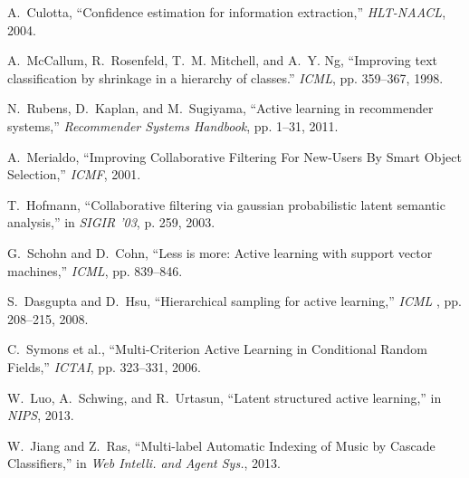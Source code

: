 \documentclass[10pt,conference,compsocconf]{IEEEtran}
\begin{document}
\begin{small}
\begin{thebibliography}{10}
A.~Culotta, ``{Confidence estimation for information extraction},''
  \emph{HLT-NAACL}, 2004. %

A.~McCallum, R.~Rosenfeld, T.~M. Mitchell, and A.~Y. Ng, ``Improving text
  classification by shrinkage in a hierarchy of classes.'' \emph{ICML},
  pp. 359--367, 1998.

N.~Rubens, D.~Kaplan, and M.~Sugiyama, ``{Active learning in recommender
  systems},'' \emph{Recommender Systems Handbook}, pp. 1--31, 2011. %

A.~Merialdo, ``{Improving Collaborative Filtering For New-Users By Smart Object
  Selection},'' \emph{ICMF}, 2001. %

T.~Hofmann, ``{Collaborative filtering via gaussian probabilistic latent
  semantic analysis},'' in \emph{ SIGIR '03}, p. 259, 2003.

G.~Schohn and D.~Cohn, ``{Less is more: Active learning with support vector
  machines},'' \emph{ICML}, pp. 839--846. %

S.~Dasgupta and D.~Hsu, ``{Hierarchical sampling for active learning},''
  \emph{ICML }, pp. 208--215, 2008. %

C.~Symons et al.,
  ``{Multi-Criterion Active Learning in Conditional
  Random Fields},'' \emph{ ICTAI}, pp. 323--331, 2006. %

W.~Luo, A.~Schwing, and R.~Urtasun, ``Latent structured active learning,'' in
  \emph{NIPS}, 2013.
  
W.~Jiang and Z.~Ras, ``Multi-label Automatic Indexing of Music by Cascade Classifiers,'' in \emph{Web Intelli. and Agent Sys.}, 2013.

\end{thebibliography}
\end{small}

\end{document}
